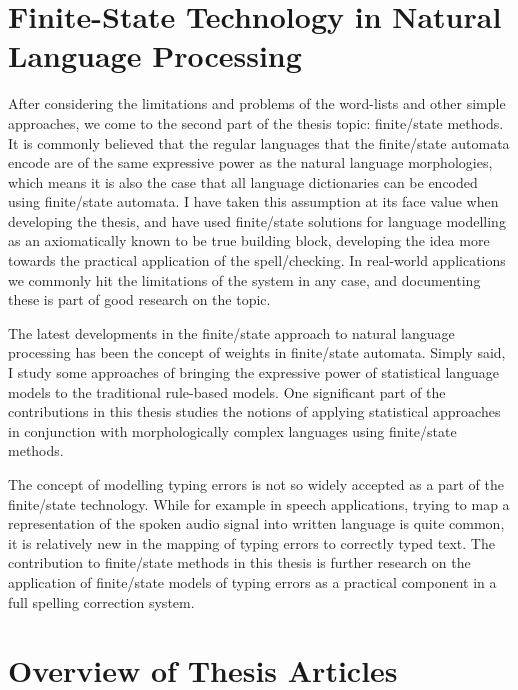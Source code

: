 \documentclass[officiallayout]{unihelcompling}
\begin{document}
\section{Finite-State Technology in Natural Language Processing}
\label{sec:finite-state-technology-in-nlp}

After considering the limitations and problems of the word-lists and other
simple approaches, we come to the second part of the thesis topic: finite\-/state
methods.  It is commonly believed that the regular languages that the
finite\-/state automata encode are of the same expressive power as the natural
language morphologies, which means it is also the case that all language
dictionaries can be encoded using finite\-/state automata. I have taken this
assumption at its face value when developing the thesis, and have used
finite\-/state solutions for language modelling as an axiomatically known to be
true building block, developing the idea more towards the practical application
of the spell\-/checking. In real-world applications we commonly hit the
limitations of the system in any case, and documenting these is part of good
research on the topic.

The latest developments in the finite\-/state approach to natural language
processing has been the concept of weights in finite\-/state automata.  Simply
said, I study some approaches of bringing the expressive power of statistical
language models to the traditional rule-based models. One significant part of
the contributions in this thesis studies the notions of applying statistical
approaches in conjunction with morphologically complex languages using
finite\-/state methods.

The concept of modelling typing errors is not so widely accepted as a part of
the finite\-/state technology. While for example in speech applications,
trying to map a representation of the spoken audio signal into written language
is quite common, it is relatively new in the mapping of typing errors to
correctly typed text. The contribution to finite\-/state methods in this thesis
is further research on the application of finite\-/state models of typing errors
as a practical component in a full spelling correction system.


\section{Overview of Thesis Articles}
\label{sec:articles}
\end{document}

